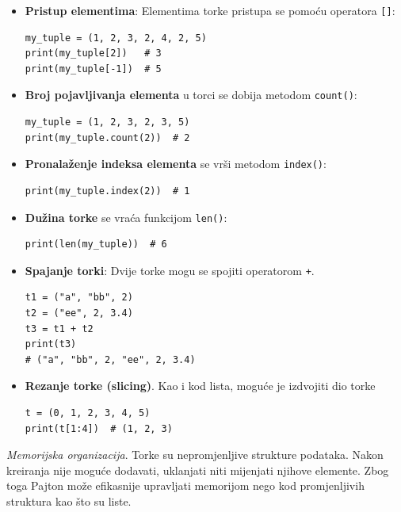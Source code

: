 \begin{itemize}
	
	\item \textbf{Pristup elementima}:	Elementima torke pristupa se pomoću operatora \texttt{[]}:
	
	\begin{verbatim}
my_tuple = (1, 2, 3, 2, 4, 2, 5)
print(my_tuple[2])   # 3
print(my_tuple[-1])  # 5
\end{verbatim}
	
	\item \textbf{Broj pojavljivanja elementa} u torci se dobija metodom \texttt{count()}:
	
	\begin{verbatim}
my_tuple = (1, 2, 3, 2, 3, 5)
print(my_tuple.count(2))  # 2
\end{verbatim}
	
	\item \textbf{Pronalaženje indeksa elementa} se vrši  metodom \texttt{index()}:
	
	\begin{verbatim}
print(my_tuple.index(2))  # 1
\end{verbatim}
	
	\item \textbf{Dužina torke} se vraća funkcijom \texttt{len()}:
	\begin{verbatim}
print(len(my_tuple))  # 6
\end{verbatim}
	
	\item \textbf{Spajanje torki}: Dvije torke mogu se spojiti operatorom \texttt{+}.
	
	\begin{verbatim}
t1 = ("a", "bb", 2)
t2 = ("ee", 2, 3.4)
t3 = t1 + t2
print(t3)
# ("a", "bb", 2, "ee", 2, 3.4)
\end{verbatim}
	
	\item \textbf{Rezanje torke (slicing)}.	Kao i kod lista, moguće je izdvojiti dio torke
	
	\begin{verbatim}
t = (0, 1, 2, 3, 4, 5)
print(t[1:4])  # (1, 2, 3)
\end{verbatim}
	
\end{itemize}

\textit{Memorijska organizacija}. Torke su nepromjenljive strukture podataka. Nakon kreiranja nije moguće dodavati, uklanjati niti mijenjati njihove elemente. Zbog toga Pajton može efikasnije upravljati memorijom nego kod promjenljivih struktura kao što su liste.

